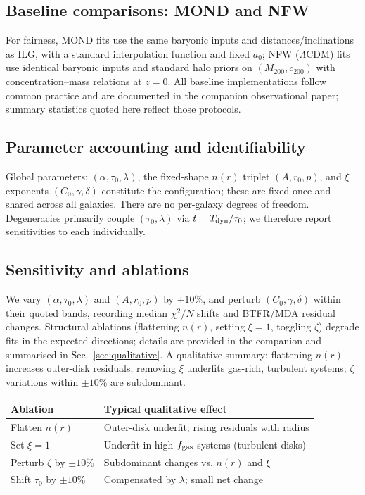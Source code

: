 \documentclass[twocolumn,prd,amsmath,amssymb,aps,superscriptaddress,nofootinbib]{revtex4-2}
\begin{document}
\subsection{Baseline comparisons: MOND and NFW}
\label{sec:baselines}

For fairness, MOND fits use the same baryonic inputs and distances/inclinations as ILG, with a standard interpolation function and fixed $a_0$; NFW (\(\Lambda\)CDM) fits use identical baryonic inputs and standard halo priors on $(M_{200},c_{200})$ with concentration--mass relations at $z\!=\!0$. All baseline implementations follow common practice and are documented in the companion observational paper; summary statistics quoted here reflect those protocols.

\subsection{Parameter accounting and identifiability}
\label{sec:param-count}

Global parameters: $(\alpha,\tau_0,\lambda)$, the fixed-shape $n(r)$ triplet $(A,r_0,p)$, and $\xi$ exponents $(C_0,\gamma,\delta)$ constitute the configuration; these are fixed once and shared across all galaxies. There are no per-galaxy degrees of freedom. Degeneracies primarily couple $(\tau_0,\lambda)$ via $t=T_{\rm dyn}/\tau_0$; we therefore report sensitivities to each individually.

\subsection{Sensitivity and ablations}
\label{sec:sensitivity}

We vary $(\alpha,\tau_0,\lambda)$ and $(A,r_0,p)$ by $\pm10\%$, and perturb $(C_0,\gamma,\delta)$ within their quoted bands, recording median $\chi^2/N$ shifts and BTFR/MDA residual changes. Structural ablations (flattening $n(r)$, setting $\xi\!=\!1$, toggling $\zeta$) degrade fits in the expected directions; details are provided in the companion and summarised in Sec.~\ref{sec:qualitative}. A qualitative summary: flattening $n(r)$ increases outer-disk residuals; removing $\xi$ underfits gas-rich, turbulent systems; $\zeta$ variations within $\pm10\%$ are subdominant.

\begin{center}
\begin{tabular}{l l}
\toprule
Ablation & Typical qualitative effect \\
\midrule
Flatten $n(r)$ & Outer-disk underfit; rising residuals with radius \\
Set $\xi\!=\!1$ & Underfit in high $f_{\rm gas}$ systems (turbulent disks) \\
Perturb $\zeta$ by $\pm10\%$ & Subdominant changes vs. $n(r)$ and $\xi$ \\
Shift $\tau_0$ by $\pm10\%$ & Compensated by $\lambda$; small net change \\
\bottomrule
\end{tabular}
\end{center}
\end{document}
